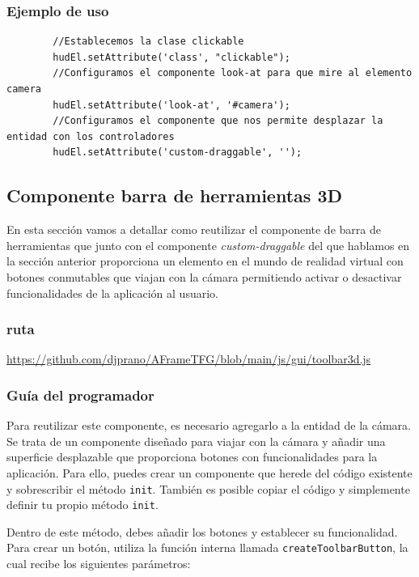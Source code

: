 \documentclass[a4paper, 11pt]{book}
\begin{document}
\subsubsection{Ejemplo de uso}
{\scriptsize
	\begin{verbatim}
		//Establecemos la clase clickable
		hudEl.setAttribute('class', "clickable");
		//Configuramos el componente look-at para que mire al elemento camera
		hudEl.setAttribute('look-at', '#camera');
		//Configuramos el componente que nos permite desplazar la entidad con los controladores
		hudEl.setAttribute('custom-draggable', '');
	\end{verbatim}
}
\subsection{Componente barra de herramientas 3D}
En esta sección vamos a detallar como reutilizar el componente de barra de herramientas que junto con el componente \emph{custom-draggable} del que hablamos en la sección anterior proporciona un elemento en el mundo de realidad virtual con botones conmutables que viajan con la cámara permitiendo activar o desactivar funcionalidades de la aplicación al usuario.
\subsubsection{ruta}
{\scriptsize
	\url{https://github.com/djprano/AFrameTFG/blob/main/js/gui/toolbar3d.js}
}
\subsubsection{Guía del programador}
\label{subsec:guiaBarra3d}
Para reutilizar este componente, es necesario agregarlo a la entidad de la cámara. Se trata de un componente diseñado para viajar con la cámara y añadir una superficie desplazable que proporciona botones con funcionalidades para la aplicación.
Para ello, puedes crear un componente que herede del código existente y sobrescribir el método \texttt{init}. También es posible copiar el código y simplemente definir tu propio método \texttt{init}.

Dentro de este método, debes añadir los botones y establecer su funcionalidad. Para crear un botón, utiliza la función interna llamada \texttt{createToolbarButton}, la cual recibe los siguientes parámetros:
\end{document}
